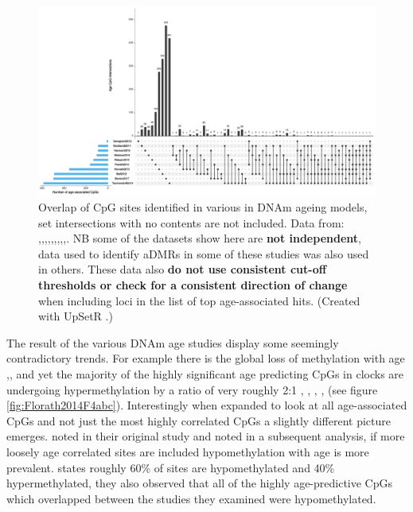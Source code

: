 \documentclass[
]{book}
\begin{document}
\begin{figure}
\includegraphics[width=20in]{figs/AgeCpGUpSet} \caption{Overlap of CpG sites identified in various in DNAm ageing models, set intersections with no contents are not included.
Data from: \citep{Rakyan2010},\citep{Teschendorff2010},\citep{Bocklandt2011},\citep{Garagnani2012},\citep{Bell2012},\citep{Hannum2013},\citep{Horvath2013},\citep{Florath2014},\citep{Weidner2014},\citep{Benton2017}. NB some of the datasets show here are \textbf{not independent}, data used to identify aDMRs in some of these studies was also used in others. These data also \textbf{do not use consistent cut-off thresholds or check for a consistent direction of change} when including loci in the list of top age-associated hits.
(Created with UpSetR \citep{Lex2014}.)}\label{fig:AgeCpGUpSet}
\end{figure}





The result of the various DNAm age studies display some seemingly contradictory trends. For example there is the global loss of methylation with age \citep{Wilson1987},\citep{Fraga2005},\citep{Heyn2012} and yet the majority of the highly significant age predicting CpGs in clocks are undergoing hypermethylation by a ratio of very roughly 2:1 \citep{Rakyan2010}, \citep{Bocklandt2011}, \citep{Koch2011}, \citep{Garagnani2012}, \citep{Florath2014} (see figure \ref{fig:Florath2014F4abc}). Interestingly when expanded to look at all age-associated CpGs and not just the most highly correlated CpGs a slightly different picture emerges. \citet{Teschendorff2010} noted in their original study and \citet{Zhang2017} noted in a subsequent analysis, if more loosely age correlated sites are included hypomethylation with age is more prevalent. \citet{Zhang2017} states roughly 60\% of sites are hypomethylated and 40\% hypermethylated, they also observed that all of the highly age-predictive CpGs which overlapped between the studies they examined were hypomethylated.
\end{document}
